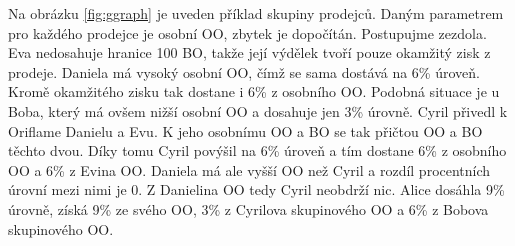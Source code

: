 \documentclass[a4wide,12pt]{report}
\begin{document}
Na obrázku \ref{fig:ggraph} je uveden příklad skupiny prodejců. Daným parametrem pro každého prodejce je osobní OO, zbytek je dopočítán. Postupujme zezdola. Eva nedosahuje hranice 100 BO, takže její výdělek tvoří pouze okamžitý zisk z prodeje. Daniela má vysoký osobní OO, čímž se sama dostává na 6\% úroveň. Kromě okamžitého zisku tak dostane i 6\% z osobního OO. Podobná situace je u Boba, který má ovšem nižší osobní OO a dosahuje jen 3\% úrovně. Cyril přivedl k Oriflame Danielu a Evu. K jeho osobnímu OO a BO se tak přičtou OO a BO těchto dvou. Díky tomu Cyril povýšil na 6\% úroveň a tím dostane 6\% z osobního OO a 6\% z Evina OO. Daniela má ale vyšší OO než Cyril a rozdíl procentních úrovní mezi nimi je 0. Z Danielina OO tedy Cyril neobdrží nic. Alice dosáhla 9\% úrovně, získá 9\% ze svého OO, 3\% z Cyrilova skupinového OO a 6\% z Bobova skupinového OO.
\end{document}

